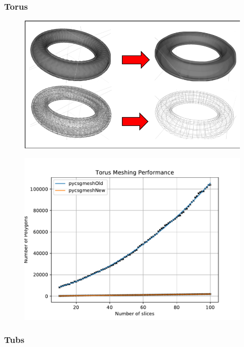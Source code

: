 \documentclass[12pt,a4paper]{article}
\begin{document}
\subsubsection{Torus}

\begin{figure}[h!]
\centering
\begin{minipage}{.2\textwidth}
  \centering
  \includegraphics[height=0.5\linewidth]{Images//Meshes//torus.png}
  \label{fig:test1}
\end{minipage}%
\begin{minipage}{.3\textwidth}
  \centering
  \includegraphics[scale=0.35]{Images//Quad_fits//Torus_quad.pdf}
  \label{fig:test2}
\end{minipage}%
\end{figure}

\subsubsection{Tubs}
\end{document}
